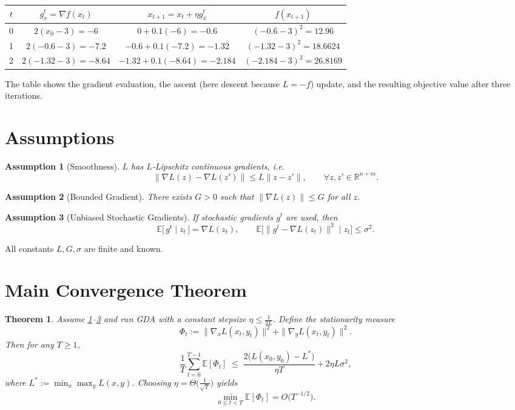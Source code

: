 \documentclass{article}
\newtheorem{theorem}{Theorem}
\newtheorem{assumption}{Assumption}
\newcommand{\E}{\mathbb{E}}
\newcommand{\R}{\mathbb{R}}
\begin{document}
\begin{center}
\begin{tabular}{c|c|c|c}
$t$ & $g_{x}^{t}=\nabla f(x_{t})$ & $x_{t+1}=x_{t}+ \eta g_{x}^{t}$ & $f(x_{t+1})$\\\hline
0 & $2(x_{0}-3)= -6$ & $0+0.1(-6)= -0.6$ & $( -0.6-3)^{2}=12.96$\\
1 & $2(-0.6-3)= -7.2$ & $-0.6+0.1(-7.2)= -1.32$ & $(-1.32-3)^{2}=18.6624$\\
2 & $2(-1.32-3)= -8.64$ & $-1.32+0.1(-8.64)= -2.184$ & $(-2.184-3)^{2}=26.8169$\\
\end{tabular}
\end{center}
The table shows the gradient evaluation, the ascent (here descent because $L=-f$) update, and the resulting objective value after three iterations.

\section*{Assumptions}
\begin{assumption}[Smoothness]\label{ass:smooth}
$L$ has $L$‑Lipschitz continuous gradients, i.e.
\[
\|\nabla L(z)-\nabla L(z')\|\le L\|z-z'\|,\qquad\forall z,z'\in\R^{n+m}.
\]
\end{assumption}
\begin{assumption}[Bounded Gradient]\label{ass:bound}
There exists $G>0$ such that $\|\nabla L(z)\|\le G$ for all $z$.
\end{assumption}
\begin{assumption}[Unbiased Stochastic Gradients]\label{ass:unbiased}
If stochastic gradients $g^{t}$ are used, then
\[
\E\big[\,g^{t}\mid z_{t}\,\big]=\nabla L(z_{t}),\qquad 
\E\big[\|g^{t}-\nabla L(z_{t})\|^{2}\mid z_{t}\big]\le\sigma^{2}.
\]
\end{assumption}
All constants $L,G,\sigma$ are finite and known.

\section*{Main Convergence Theorem}
\begin{theorem}\label{thm:main}
Assume \ref{ass:smooth}–\ref{ass:unbiased} and run GDA with a constant stepsize $\eta\le \frac{1}{2L}$.  
Define the \emph{stationarity measure}
\[
\Phi_{t}:=\|\nabla_{x}L(x_{t},y_{t})\|^{2}+\|\nabla_{y}L(x_{t},y_{t})\|^{2}.
\]
Then for any $T\ge 1$,
\[
\frac{1}{T}\sum_{t=0}^{T-1}\E[\Phi_{t}]
\;\le\;
\frac{2\big(L(x_{0},y_{0})-L^{*}\big)}{\eta T}+2\eta L\sigma^{2},
\tag{2}
\]
where $L^{*}:=\min_{x}\max_{y}L(x,y)$.  
Choosing $\eta =\Theta\!\big(\tfrac{1}{\sqrt{T}}\big)$ yields
\[
\min_{0\le t<T}\E[\Phi_{t}] = O\!\big(T^{-1/2}\big).
\]
\end{theorem}
\end{document}
